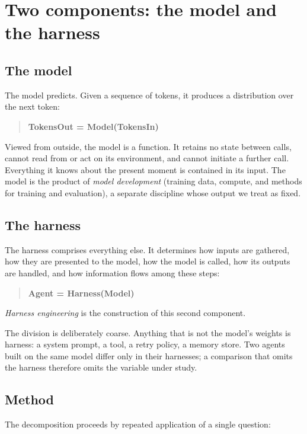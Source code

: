 \section{Two components: the model and the harness}

\subsection{The model}

The model predicts. Given a sequence of tokens, it produces a distribution over the next token:

\begin{quote}
\textbf{TokensOut = Model(TokensIn)}
\end{quote}

Viewed from outside, the model is a function. It retains no state between calls, cannot read from or act on its environment, and cannot initiate a further call. Everything it knows about the present moment is contained in its input. The model is the product of \emph{model development} (training data, compute, and methods for training and evaluation), a separate discipline whose output we treat as fixed.

\subsection{The harness}

The harness comprises everything else. It determines how inputs are gathered, how they are presented to the model, how the model is called, how its outputs are handled, and how information flows among these steps:

\begin{quote}
\textbf{Agent = Harness(Model)}
\end{quote}

\emph{Harness engineering} is the construction of this second component.

The division is deliberately coarse. Anything that is not the model's weights is harness: a system prompt, a tool, a retry policy, a memory store. Two agents built on the same model differ only in their harnesses; a comparison that omits the harness therefore omits the variable under study.

\subsection{Method}

The decomposition proceeds by repeated application of a single question:

